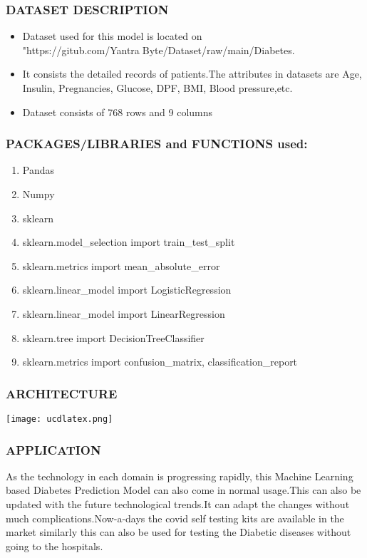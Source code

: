 \documentclass{beamer}
\begin{document}
\begin{frame}
\frametitle{\bf DATASET DESCRIPTION}
 
  \begin{itemize}
    \item Dataset used for this model is located on "https://gitub.com/YantraByte/Dataset/raw/main/Diabetes.
    \item It consists the detailed records of patients.The attributes in datasets are
Age, Insulin, Pregnancies, Glucose, DPF, BMI, Blood pressure,etc.
    \item  Dataset consists of 768 rows and 9 columns
  \end{itemize}
  
\end{frame}

\begin{frame}
\frametitle{\bf PACKAGES/LIBRARIES and FUNCTIONS used:}
    \begin{enumerate}
        \item Pandas
        \item Numpy
        \item sklearn
        \item sklearn.model\_selection import train\_test\_split
        \item sklearn.metrics import mean\_absolute\_error
        \item sklearn.linear\_model import LogisticRegression
        \item sklearn.linear\_model import LinearRegression
        \item sklearn.tree import DecisionTreeClassifier
        \item sklearn.metrics import confusion\_matrix, classification\_report
        
    \end{enumerate}
 
\end{frame}

\begin{frame}
\frametitle{\bf ARCHITECTURE}
\texttt{[image: ucdlatex.png]}
\end{frame}

\begin{frame}
\frametitle{\bf APPLICATION}
    \normalsize{As the technology in each domain is progressing rapidly, this Machine Learning based Diabetes Prediction Model can also come in normal usage.This can
also be updated with the future technological trends.It can adapt the changes
without much complications.Now-a-days the covid self testing kits are available in the market similarly this can also be used for testing the Diabetic
diseases without going to the hospitals.}
\end{frame}
\end{document}
